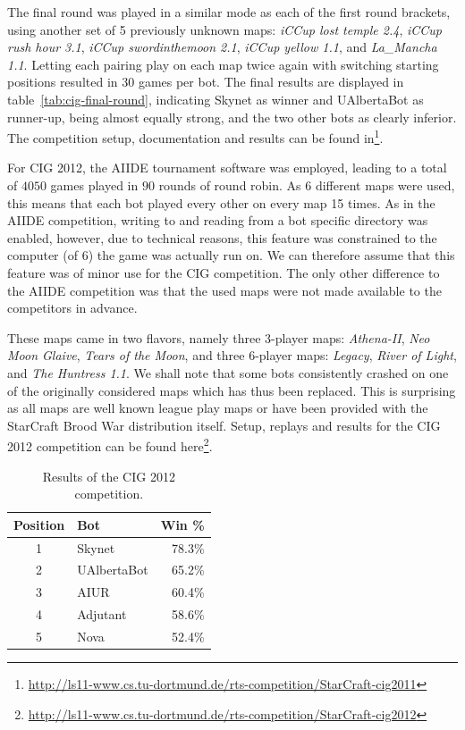 \documentclass[journal]{IEEEtran}
\begin{document}
The final round was played in a similar mode as each of the
first round brackets,
using another set of 5 previously unknown maps:
\emph{iCCup lost temple 2.4}, \emph{iCCup rush hour 3.1},
\emph{iCCup swordinthemoon 2.1}, \emph{iCCup yellow 1.1},
and \emph{La\_Mancha 1.1}. 
Letting each pairing play on each map twice again with
switching starting positions resulted in 30 games per bot.
The final results are displayed in table~\ref{tab:cig-final-round},
indicating Skynet as winner and UAlbertaBot as runner-up, being
almost equally strong, and the two other bots as clearly inferior.
The competition setup, documentation and results can be found
in\footnote{\url{http://ls11-www.cs.tu-dortmund.de/rts-competition/StarCraft-cig2011}}.


For CIG 2012, the AIIDE tournament software was employed,
leading to a total of $4050$ games played in $90$ rounds
of round robin. As 6 different maps were used, this means
that each bot played every other on every map 15 times. 
As in the AIIDE competition, writing to and reading from
a bot specific directory was enabled, however, due to 
technical reasons, this feature was constrained to the
computer (of 6) the game was actually run on. We can 
therefore assume that this feature was of minor use for
the CIG competition. The only other difference to the
AIIDE competition was that the used maps were not 
made available to the competitors in advance. 

These maps came in two flavors, namely three 3-player maps:
\emph{Athena-II}, \emph{Neo Moon Glaive}, \emph{Tears of the Moon},
and three 6-player maps:
\emph{Legacy}, \emph{River of Light}, and 
\emph{The Huntress 1.1}. 
We shall note that some bots consistently crashed on one
of the originally considered maps which has thus been replaced.
This is surprising as all maps are well known league play maps
or have been provided with the StarCraft Brood War distribution
itself.
Setup, replays and results for the CIG 2012 competition can be found
here\footnote{\url{http://ls11-www.cs.tu-dortmund.de/rts-competition/StarCraft-cig2012}}.

\begin{table}[t]
\caption{Results of the CIG 2012 competition.}
\label{tab:cig2012}
\centering
\begin{tabular}{|c|l|r|}
\hline
{\bfseries Position} & {\bfseries Bot} & {\bfseries Win \%} \\
\hline
1 & Skynet & 78.3\% \\
2 & UAlbertaBot & 65.2\% \\
3 & AIUR & 60.4\% \\
4 & Adjutant & 58.6\% \\
5 & Nova & 52.4\% \\ 
\hline
\end{tabular}
\end{table}
\end{document}
